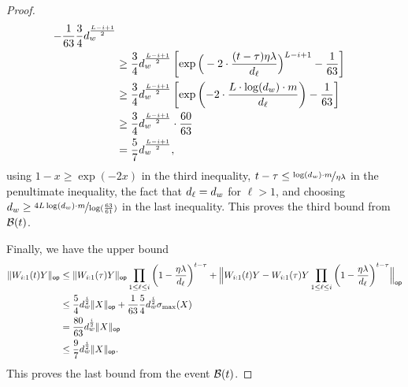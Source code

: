 \begin{proof}
\begin{align*}
                            - \frac{1}{63} \frac{3}{4} d_w^{\frac{L-i+1}{2}} \\
                            &\geq \frac{3}{4} \dhid^{\frac{L - i + 1}{2}} \left[
                              \exp\Big(-2 \cdot \frac{(t - \tau)\eta \lambda}{d_{\ell}}\Big)^{L - i + 1} - \frac{1}{63}
                            \right] \\
                            &\geq \frac{3}{4} \dhid^{\frac{L - i + 1}{2}}
                            \left[
                              \exp\left(-2 \cdot \frac{L \cdot \log(\dhid) \cdot \din}{d_{\ell}}\right) - \frac{1}{63}
                            \right] \\
                            &\geq
                            \frac{3}{4} \dhid^{\frac{L - i + 1}{2}} \cdot \frac{60}{63} \\
                            &= \frac{5}{7} \dhid^{\frac{L - i + 1}{2}},
\end{align*}
using $1 - x \geq \exp(-2x)$ in the third inequality, $t - \tau \leq \nicefrac{ \log(\dhid) \cdot \din}{\eta \lambda}$
in the penultimate inequality, the fact that $d_{\ell} = \dhid$ for $\ell > 1$,
and choosing $d_{w} \geq \nicefrac{4L \log(\dhid) \cdot \din}{\log(\frac{63}{61})}$ in the last
inequality. This proves the third bound from $\cB(t)$.

Finally, we have the upper bound
\begin{align*}
   \opnorm{W_{i:1}(t)Y} &\leq \opnorm{W_{i:1}(\tau)Y} \prod_{1 \leq \ell \leq i} \left(1-\frac{\eta \lambda}{d_{\ell}}\right)^{t-\tau} +
  \opnorm[\Big]{W_{i:1}(t)Y - W_{i:1}(\tau)Y \prod_{1 \leq \ell \leq i} \left(1 - \frac{\eta \lambda}{d_{\ell}}\right)^{t - \tau}} \\
                        & \leq  \frac{5}{4} \dhid^{\frac{i}{2}} \opnorm{X}   +
  \frac{1}{63} \frac{5}{4}  \dhid^{\frac{i}{2}}  \sigma_{\max}(X) \\
                        &= \frac{80}{63}  \dhid^{\frac{i}{2}} \opnorm{X} \\
                        &\leq \frac{9}{7}  d_w^{\frac{i}{2}} \opnorm{X}.
\end{align*}
This proves the last bound from the event $\cB(t)$.
\end{proof}
